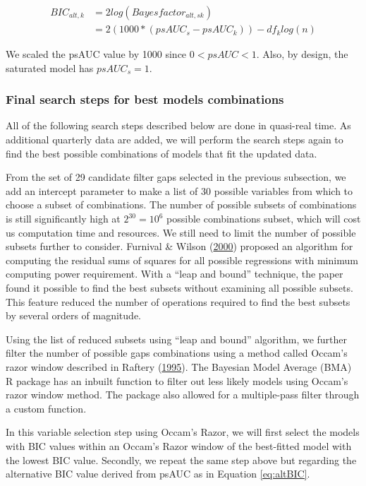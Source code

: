 \documentclass[
  12pt,
]{article}
\begin{document}
\begin{align} \label{eq:altBIC}
BIC_{alt,k} &= 2log (Bayesfactor_{alt,sk}) \\
&= 2(1000*(psAUC_s-psAUC_k)) - df_klog(n)
\end{align}

We scaled the psAUC value by 1000 since \(0<psAUC<1\). Also, by design, the saturated model has \(psAUC_s=1\).

\hypertarget{final-search-steps-for-best-models-combinations}{%
\subsubsection{Final search steps for best models combinations}\label{final-search-steps-for-best-models-combinations}}

All of the following search steps described below are done in quasi-real time. As additional quarterly data are added, we will perform the search steps again to find the best possible combinations of models that fit the updated data.

From the set of 29 candidate filter gaps selected in the previous subsection, we add an intercept parameter to make a list of 30 possible variables from which to choose a subset of combinations. The number of possible subsets of combinations is still significantly high at \(2^{30} = 10^6\) possible combinations subset, which will cost us computation time and resources. We still need to limit the number of possible subsets further to consider. Furnival \& Wilson (\protect\hyperlink{ref-furnival_regressions_2000}{2000}) proposed an algorithm for computing the residual sums of squares for all possible regressions with minimum computing power requirement. With a ``leap and bound'' technique, the paper found it possible to find the best subsets without examining all possible subsets. This feature reduced the number of operations required to find the best subsets by several orders of magnitude.

Using the list of reduced subsets using ``leap and bound'' algorithm, we further filter the number of possible gaps combinations using a method called Occam's razor window described in Raftery (\protect\hyperlink{ref-raftery_bayesian_1995}{1995}). The Bayesian Model Average (BMA) R package has an inbuilt function to filter out less likely models using Occam's razor window method. The package also allowed for a multiple-pass filter through a custom function.

In this variable selection step using Occam's Razor, we will first select the models with BIC values within an Occam's Razor window of the best-fitted model with the lowest BIC value. Secondly, we repeat the same step above but regarding the alternative BIC value derived from psAUC as in Equation \eqref{eq:altBIC}.
\end{document}
